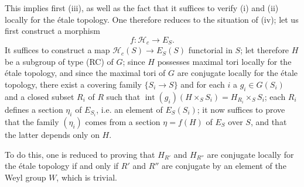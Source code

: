 This implies first (iii), as well as the fact that it suffices to verify (i) and (ii) locally for the \'etale topology. One therefore reduces to the situation of (iv); let us first construct a morphism
\[
f:\mathscr H_c\to E_S.
\]
It suffices to construct a map $\mathscr H_c(S)\to E_S(S)$ functorial in $S$; let therefore $H$ be a subgroup of type (RC) of $G$; since $H$ possesses maximal tori locally for the \'etale topology, and since the maximal tori of $G$ are conjugate locally for the \'etale topology, there exist a covering family $\{S_i\to S\}$ and for each $i$ a $g_i\in G(S_i)$ and a closed subset $R_i$ of $R$ such that $\operatorname{int}(g_i)(H\times_S S_i)=H_{R_i}\times_S S_i$; each $R_i$ defines a section $\eta_i$ of $E_{S_i}$, i.e. an element of $E_S(S_i)$; it now suffices to prove that the family $(\eta_i)$ comes from a section $\eta=f(H)$ of $E_S$ over $S$, and that the latter depends only on $H$.

To do this, one is reduced to proving that $H_{R'}$ and $H_{R''}$ are conjugate locally for the \'etale topology if and only if $R'$ and $R''$ are conjugate by an element of the Weyl group $W$, which is trivial.

